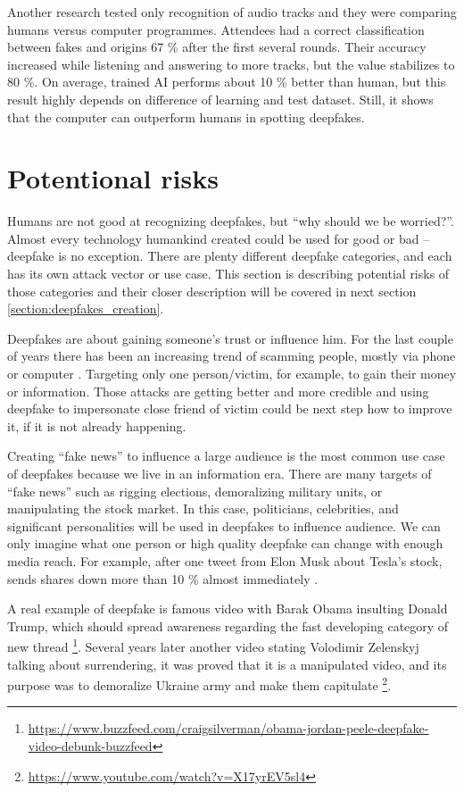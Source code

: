 Another research tested only recognition of audio tracks and they were comparing humans versus computer programmes. Attendees had a correct classification between fakes and origins 67 \% after the first several rounds. Their accuracy increased while listening and answering to more tracks, but the value stabilizes to 80 \%. On average, trained AI performs about 10 \% better than human, but this result highly depends on difference of learning and test dataset. Still, it shows that the computer can outperform humans in spotting deepfakes. \cite{HumanPerceptionAudio}

\section{Potentional risks}

Humans are not good at recognizing deepfakes, but “why should we be worried?”. Almost every technology humankind created could be used for good or bad – deepfake is no exception. There are plenty different deepfake categories, and each has its own attack vector or use case. This section is describing potential risks of those categories and their closer description will be covered in next section \ref{section:deepfakes_creation}.

Deepfakes are about gaining someone’s trust or influence him. For the last couple of years there has been an increasing trend of scamming people, mostly via phone or computer \cite{HybridVishingAttacksSkyrocketing}. Targeting only one person/victim, for example, to gain their money or information. Those attacks are getting better and more credible and using deepfake to impersonate close friend of victim could be next step how to improve it, if it is not already happening.

Creating “fake news” to influence a large audience is the most common use case of deepfakes because we live in an information era. There are many targets of “fake news” such as rigging elections, demoralizing military units, or manipulating the stock market. In this case, politicians, celebrities, and significant personalities will be used in deepfakes to influence audience. We can only imagine what one person or high quality deepfake can change with enough media reach. For example, after one tweet from Elon Musk about Tesla’s stock, sends shares down more than 10 \% almost immediately \cite{ElonMusksTweets}. \cite{IncreasingThreatofDeepfakeIdentites}

A real example of deepfake is famous video with Barak Obama insulting Donald Trump, which should spread awareness regarding the fast developing category of new thread \footnote{\url{https://www.buzzfeed.com/craigsilverman/obama-jordan-peele-deepfake-video-debunk-buzzfeed}}. Several years later another video stating Volodimir Zelenskyj talking about surrendering, it was proved that it is a manipulated video, and its purpose was to demoralize Ukraine army and make them capitulate \footnote{\url{https://www.youtube.com/watch?v=X17yrEV5sl4}}.

